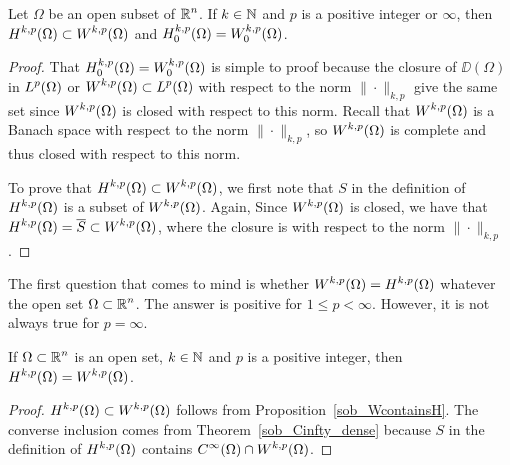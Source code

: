 \begin{prop} \label{sob_WcontainsH}
Let $\Omega$ be an open subset of $\displaystyle \mathbb{R}^n$.  If
$k\in \mathbb{N}$ and $p$ is a positive integer or $\infty$, then
$\displaystyle H^{k,p}(\Omega) \subset W^{k,p}(\Omega)$ and
$\displaystyle H^{k,p}_0(\Omega) = W^{k,p}_0(\Omega)$.
\end{prop}

\begin{proof}
That $\displaystyle H^{k,p}_0(\Omega) = W^{k,p}_0(\Omega)$ is simple
to proof because the closure of $\DD(\Omega)$ in $\displaystyle L^p(\Omega)$ or
$\displaystyle W^{k,p}(\Omega)\subset L^p(\Omega)$ with respect to the
norm $\|\cdot\|_{k,p}$ give the same
set since $\displaystyle W^{k,p}(\Omega)$ is closed with respect to this norm.
Recall that $\displaystyle W^{k,p}(\Omega)$ is a Banach space with
respect to the norm 
$\|\cdot\|_{k,p}$, so $\displaystyle W^{k,p}(\Omega)$ is complete and
thus closed with respect to this norm.

To prove that $\displaystyle H^{k,p}(\Omega) \subset W^{k,p}(\Omega)$,
we first note that $S$ in the definition of
$\displaystyle H^{k,p}(\Omega)$ is a subset of
$\displaystyle W^{k,p}(\Omega)$.  Again, Since
$\displaystyle W^{k,p}(\Omega)$ is closed, we have that
$\displaystyle H^{k,p}(\Omega) = \overline{S} \subset W^{k,p}(\Omega)$,
where the closure is with respect to the norm $\|\cdot\|_{k,p}$.
\end{proof}

The first question that comes to mind is whether
$\displaystyle W^{k,p}(\Omega) = H^{k,p}(\Omega)$ whatever the open set
$\displaystyle \Omega \subset \mathbb{R}^n$.  The answer is positive for
$1\leq p < \infty$.  However, it is not always true for $p=\infty$.

\begin{theorem} \label{sob_HequalsW}
If $\displaystyle \Omega \subset \mathbb{R}^n$ is an open set, $k\in \mathbb{N}$ and $p$ is a
positive integer, then $\displaystyle H^{k,p}(\Omega) = W^{k,p}(\Omega)$.
\end{theorem}

\begin{proof}
$\displaystyle H^{k,p}(\Omega) \subset W^{k,p}(\Omega)$ follows from
Proposition~\ref{sob_WcontainsH}.  The converse inclusion comes from
Theorem~\ref{sob_Cinfty_dense} because $S$ in the definition of
$\displaystyle H^{k,p}(\Omega)$ contains
$\displaystyle C^\infty(\Omega) \cap W^{k,p}(\Omega)$.
\end{proof}


